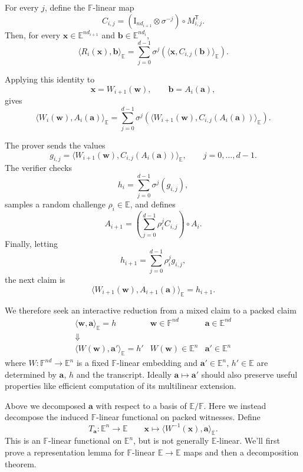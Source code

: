 For every $j$, define the $\mathbb F$-linear map
\[
C_{i,j}
=
(\mathrm I_{nd_{i+1}}\otimes\sigma^{-j})
\circ
M_{i,j}^{\mathsf T}.
\]
Then, for every
$\mathbf x\in\mathbb E^{nd_{i+1}}$
and
$\mathbf b\in\mathbb E^{nd_i}$,
\[
\langle R_i(\mathbf x),\mathbf b\rangle_{\mathbb E}
=
\sum_{j=0}^{d-1}
\sigma^j\!\left(
\langle
\mathbf x,
C_{i,j}(\mathbf b)
\rangle_{\mathbb E}
\right).
\]

Applying this identity to
\[
\mathbf x=W_{i+1}(\mathbf w),
\qquad
\mathbf b=A_i(\mathbf a),
\]
gives
\[
\langle
W_i(\mathbf w),
A_i(\mathbf a)
\rangle_{\mathbb E}
=
\sum_{j=0}^{d-1}
\sigma^j\!\left(
\langle
W_{i+1}(\mathbf w),
C_{i,j}(A_i(\mathbf a))
\rangle_{\mathbb E}
\right).
\]

The prover sends the values
\[
g_{i,j}
=
\langle
W_{i+1}(\mathbf w),
C_{i,j}(A_i(\mathbf a))
\rangle_{\mathbb E},
\qquad
j=0,\ldots,d-1.
\]
The verifier checks
\[
h_i
=
\sum_{j=0}^{d-1}
\sigma^j(g_{i,j}),
\]
samples a random challenge
$\rho_i\in\mathbb E$,
and defines
\[
A_{i+1}
=
\left(
\sum_{j=0}^{d-1}
\rho_i^j C_{i,j}
\right)
\circ A_i.
\]
Finally, letting
\[
h_{i+1}
=
\sum_{j=0}^{d-1}
\rho_i^j g_{i,j},
\]
the next claim is
\[
\langle
W_{i+1}(\mathbf w),
A_{i+1}(\mathbf a)
\rangle_{\mathbb E}
=
h_{i+1}.
\]


We therefore seek an interactive reduction from a mixed claim to a packed claim
\[
\begin{array}{ccc}
\langle \mathbf{w}, \mathbf{a}\rangle_\mathbb{E} = h
&
\mathbf{w} \in \mathbb{F}^{nd}
&
\mathbf{a} \in \mathbb{E}^{nd}
\\[.8ex]
\Downarrow
\\[1.3ex]
\langle W(\mathbf{w}), \mathbf{a}'\rangle_\mathbb{E} = h'
&
W(\mathbf{w}) \in \mathbb{E}^{n}
&
\mathbf{a}' \in \mathbb{E}^{n}
\end{array}
\]
where $W: \mathbb{F}^{nd} \to \mathbb{E}^{n}$ is a fixed $\mathbb{F}$-linear embedding and $\mathbf{a}' \in \mathbb{E}^{n}$, $h' \in \mathbb{E}$ are determined by $\mathbf{a}$, $h$ and the transcript. Ideally $\mathbf{a} \mapsto \mathbf{a}'$ should also preserve useful properties like efficient computation of its multilinear extension.

Above we decomposed $\mathbf{a}$ with respect to a basis of $\mathbb{E}/\mathbb{F}$. Here we instead decompose the induced $\mathbb F$-linear functional on packed witnesses. Define
\[
T_{\mathbf{a}} : \mathbb{E}^n \to \mathbb{E} \qquad \mathbf{x} \mapsto \langle W^{-1}(
\mathbf{x}), \mathbf{a} \rangle_{\mathbb{E}}\text{.}
\]
This is an $\mathbb{F}$-linear functional on $\mathbb E^n$, but is not generally $\mathbb{E}$-linear. We'll first prove a representation lemma for $\mathbb{F}$-linear $\mathbb{E}\to\mathbb{E}$ maps and then a decomposition theorem.

